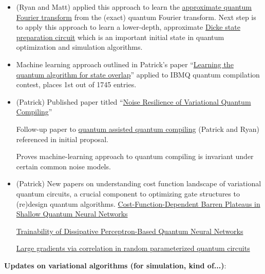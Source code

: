 \documentclass[11pt]{article}
\begin{document}
\begin{itemize}
    \item (Ryan and Matt) applied this approach to learn the \href{https://arxiv.org/abs/quant-ph/9601018}{approximate quantum Fourier transform} from the (exact) quantum Fourier transform.
        \subitem Next step is to apply this approach to learn a lower-depth, approximate \href{https://arxiv.org/abs/1904.07358}{Dicke state preparation circuit} which is an important initial state in quantum optimization and simulation algorithms.
    
    \item Machine learning approach outlined in Patrick's paper ``\href{https://iopscience.iop.org/article/10.1088/1367-2630/aae94a}{Learning the quantum algorithm for state overlap}'' applied to IBMQ quantum compilation contest, places 1st out of 1745 entries.
    
    \item (Patrick) Published paper titled ``\href{https://arxiv.org/abs/1908.04416}{Noise Resilience of Variational Quantum Compiling}''
    
        \subitem Follow-up paper to \href{https://quantum-journal.org/papers/q-2019-05-13-140/}{quantum assisted quantum compiling} (Patrick and Ryan) referenced in initial proposal.
        
        \subitem Proves machine-learning approach to quantum compiling is invariant under certain common noise models.
    
    \item (Patrick) New papers on understanding cost function landscape of variational quantum circuits, a crucial component to optimizing gate structures to (re)design quantum algorithms.
        \subitem \href{https://arxiv.org/abs/2001.00550}{Cost-Function-Dependent Barren Plateaus in Shallow Quantum Neural Networks}
        
        \subitem \href{https://arxiv.org/abs/2005.12458}{Trainability of Dissipative Perceptron-Based Quantum Neural Networks}
        
        \subitem \href{https://arxiv.org/abs/2005.12200}{Large gradients via correlation in random parameterized quantum circuits}
\end{itemize}

\textbf{Updates on variational algorithms (for simulation, kind of...)}:
\end{document}
